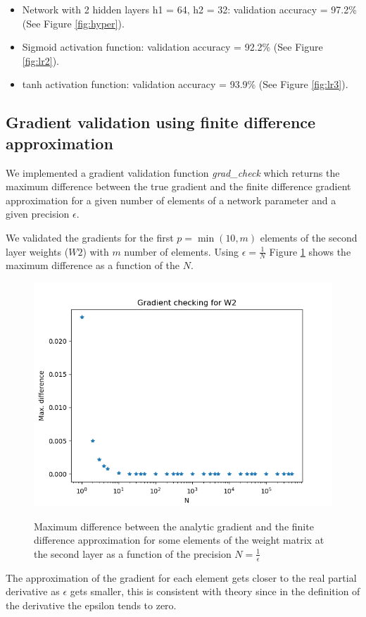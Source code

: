 \documentclass[a4paper]{article}
\begin{document}
\begin{enumerate}
\begin{itemize}

\item Network with 2 hidden layers h1 = 64, h2 = 32: validation accuracy = 97.2\% (See Figure \ref{fig:hyper}).

\item Sigmoid activation function: validation accuracy = 92.2\% (See Figure \ref{fig:lr2}).

\item tanh activation function: validation accuracy = 93.9\% (See Figure \ref{fig:lr3}).  
  
\end{itemize}

\subsection{Gradient validation using finite difference approximation}
We implemented a gradient validation function \emph{grad\_check} which returns the maximum difference between the true gradient and the finite difference gradient approximation for a given number of elements of a network parameter and a given precision $\epsilon$.

We validated the gradients for the first $p=\min(10,m)$ elements of the second layer weights ($W2$) with $m$ number of elements. Using $\epsilon=\frac{1}{N}$ Figure \ref{fig:grad_check} shows the maximum difference as a function of the $N$.

\begin{figure}
\centering
\includegraphics[width=1\textwidth]{grad_check}
\label{fig:grad_check}
\caption{Maximum difference between the analytic gradient and the finite difference approximation for some elements of the weight matrix at the second layer as a function of the precision $N = \frac{1}{\epsilon}$}
\end{figure}

The approximation of the gradient for each element gets closer to the real partial derivative as $\epsilon$ gets smaller, this is consistent with theory since in the definition of the derivative the epsilon tends to zero. 

\end{enumerate}
\end{document}
